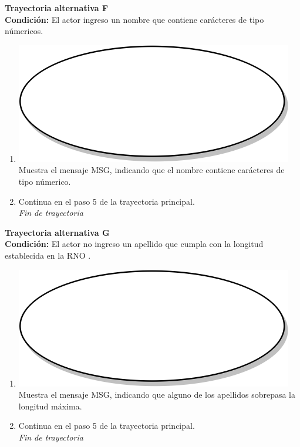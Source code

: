 \textbf{Trayectoria alternativa F} \label{cu2_ta_f}\\
\textbf{Condición:} El actor ingreso un nombre que contiene carácteres de tipo númericos.\\
 \begin{enumerate}[label=F\arabic*]
    \item {\includegraphics[scale=.05]{Capitulo3/img/proceso.png} Muestra el mensaje MSG, indicando que el nombre contiene carácteres de tipo númerico.}
    \item {Continua en el paso 5 de la trayectoria principal.} \\
    \textit{Fin de trayectoria} \\
\end{enumerate}

\textbf{Trayectoria alternativa G} \label{cu2_ta_g}\\
\textbf{Condición:} El actor no ingreso un apellido que cumpla con la longitud establecida en la RNO .\\
 \begin{enumerate}[label=G\arabic*]
    \item {\includegraphics[scale=.05]{Capitulo3/img/proceso.png} Muestra el mensaje MSG, indicando que alguno de los apellidos sobrepasa la longitud máxima.}
    \item {Continua en el paso 5 de la trayectoria principal.} \\
    \textit{Fin de trayectoria} \\
\end{enumerate}

